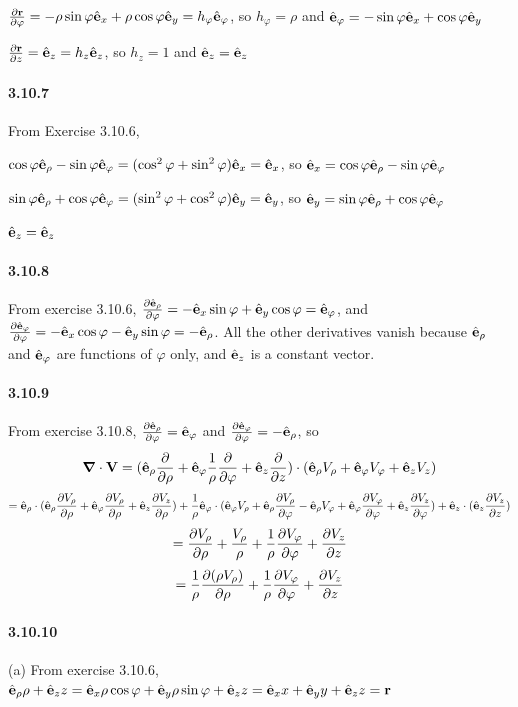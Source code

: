 \documentclass[a4paper]{article}
\begin{document}
$\pdv{\V{r}}{\varphi}=-\rho\sin\varphi\VE_x+\rho\cos\varphi\VE_y=h_\varphi\VE_\varphi$, so $h_\varphi=\rho$ and $\VE_\varphi=-\sin\varphi\VE_x+\cos\varphi\VE_y$

$\pdv{\V{r}}{z}=\VE_z=h_z\VE_z$, so $h_z=1$ and $\VE_z=\VE_z$

\paragraph{3.10.7}
From Exercise 3.10.6,

$\cos\varphi\VE_\rho-\sin\varphi\VE_\varphi=(\cos^2\varphi+\sin^2\varphi)\VE_x=\VE_x$, so $\VE_x=\cos\varphi\VE_\rho-\sin\varphi\VE_\varphi$

$\sin\varphi\VE_\rho+\cos\varphi\VE_\varphi=(\sin^2\varphi+\cos^2\varphi)\VE_y=\VE_y$, so $\VE_y=\sin\varphi\VE_\rho+\cos\varphi\VE_\varphi$

$\VE_z=\VE_z$

\paragraph{3.10.8}
From exercise 3.10.6,
$\pdv{\VE_\rho}{\varphi}=-\VE_x\sin\varphi+\VE_y\cos\varphi=\VE_\varphi$, and $\pdv{\VE_\varphi}{\varphi}=-\VE_x\cos\varphi-\VE_y\sin\varphi=-\VE_\rho$. All the other derivatives vanish because $\VE_\rho$ and $\VE_\varphi$ are functions of $\varphi$ only, and $\VE_z$ is a constant vector.

\paragraph{3.10.9}
From exercise 3.10.8, $\pdv{\VE_\rho}{\varphi}=\VE_\varphi$ and $\pdv{\VE_\varphi}{\varphi}=-\VE_\rho$, so 
\[
\del\cdot\V{V}=(\VE_\rho\pdv{}{\rho}+\VE_\varphi\frac{1}{\rho}\pdv{}{\varphi}+\VE_z\pdv{}{z})\cdot(\VE_\rho V_\rho+\VE_\varphi V_\varphi+\VE_z V_z)
\]
\[
=\VE_\rho\cdot(\VE_\rho\pdv{V_\rho}{\rho}+\VE_\varphi\pdv{V_\rho}{\rho}+\VE_z\pdv{V_z}{\rho})
+\frac{1}{\rho}\VE_\varphi\cdot(\VE_\varphi V_\rho+\VE_\rho\pdv{V_\rho}{\varphi}-\VE_\rho V_\varphi+\VE_\varphi\pdv{V_\varphi}{\varphi}+\VE_z\pdv{V_z}{\varphi})+\VE_z\cdot(\VE_z\pdv{V_z}{z})
\]
\[
=\pdv{V_\rho}{\rho}+\frac{V_\rho}{\rho}+\frac{1}{\rho}\pdv{V_\varphi}{\varphi}+\pdv{V_z}{z}
\]
\[
=\frac{1}{\rho}\pdv{(\rho V_\rho)}{\rho}+\frac{1}{\rho}\pdv{V_\varphi}{\varphi}+\pdv{V_z}{z}
\]

\paragraph{3.10.10}
(a) From exercise 3.10.6, $\VE_\rho\rho+\VE_z z=\VE_x\rho\cos\varphi+\VE_y\rho\sin\varphi+\VE_z z=\VE_x x+\VE_y y+\VE_z z=\V{r}$
\end{document}
